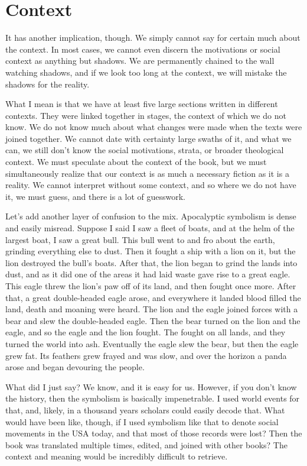 \documentclass{article}
\begin{document}
\section{Context}

It has another implication, though.
We simply cannot say for certain much about the context.
In most cases, we cannot even discern the motivations or social context as anything but shadows.
We are permanently chained to the wall watching shadows, and if we look too long at the context, we will mistake the shadows for the reality.

What I mean is that we have at least five large sections written in different contexts.
They were linked together in stages, the context of which we do not know.
We do not know much about what changes were made when the texts were joined together.
We cannot date with certainty large swaths of it, and what we can, we still don't know the social motivations, strata, or broader theological context.
We must speculate about the context of the book, but we must simultaneously realize that our context is as much a necessary fiction as it is a reality.
We cannot interpret without some context, and so where we do not have it, we must guess, and there is a lot of guesswork.

Let's add another layer of confusion to the mix.
Apocalyptic symbolism is dense and easily misread.
Suppose I said I saw a fleet of boats, and at the helm of the largest boat, I saw a great bull.
This bull went to and fro about the earth, grinding everything else to dust.
Then it fought a ship with a lion on it, but the lion destroyed the bull's boats.
After that, the lion began to grind the lands into dust, and as it did one of the areas it had laid waste gave rise to a great eagle.
This eagle threw the lion's paw off of its land, and then fought once more.
After that, a great double-headed eagle arose, and everywhere it landed blood filled the land, death and moaning were heard.
The lion and the eagle joined forces with a bear and slew the double-headed eagle.
Then the bear turned on the lion and the eagle, and so the eagle and the lion fought.
The fought on all lands, and they turned the world into ash.
Eventually the eagle slew the bear, but then the eagle grew fat.
Its feathers grew frayed and was slow, and over the horizon a panda arose and began devouring the people.

What did I just say?
We know, and it is easy for us.
However, if you don't know the history, then the symbolism is basically impenetrable.
I used world events for that, and, likely, in a thousand years scholars could easily decode that.
What would have been like, though, if I used symbolism like that to denote social movements in the USA today, and that most of those records were lost?
Then the book was translated multiple times, edited, and joined with other books?
The context and meaning would be incredibly difficult to retrieve.
\end{document}
